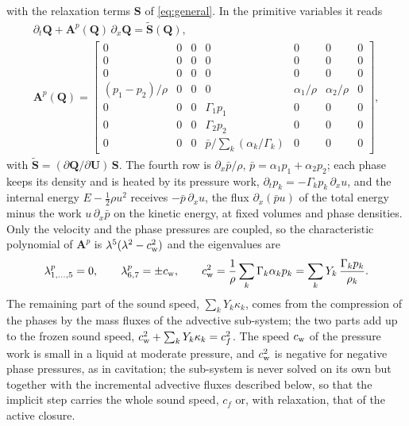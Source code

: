 \begin{enumerate}
\begin{equation}
\label{eq:pressure_sub}
\end{equation}
with the relaxation terms $\mathbf S$ of \eqref{eq:general}. In the primitive variables it reads
\begin{equation}
\begin{gathered}
\partial_t\mathbf Q+\mathbf A^p(\mathbf Q)\,\partial_x\mathbf Q=\tilde{\mathbf S}(\mathbf Q),\\
\mathbf A^p(\mathbf Q)=\begin{bmatrix}
0&0&0&0&0&0&0\\
0&0&0&0&0&0&0\\
0&0&0&0&0&0&0\\
(p_1-p_2)/\rho&0&0&0&\alpha_1/\rho&\alpha_2/\rho&0\\
0&0&0&\Gamma_1p_1&0&0&0\\
0&0&0&\Gamma_2p_2&0&0&0\\
0&0&0&\bar p\big/\sum_k(\alpha_k/\Gamma_k)&0&0&0
\end{bmatrix},
\end{gathered}
\label{eq:Ap}
\end{equation}
with $\tilde{\mathbf S}=(\partial\mathbf Q/\partial\mathbf U)\,\mathbf S$. The fourth row is $\partial_x\bar p/\rho$, $\bar p=\alpha_1p_1+\alpha_2p_2$; each phase keeps its
density and is heated by its pressure work, $\partial_tp_k=-\Gamma_kp_k\,\partial_xu$, and the internal energy $E-\tfrac12\rho u^2$ receives $-\bar p\,\partial_xu$, the flux $\partial_x(\bar pu)$ of the total energy
minus the work $u\,\partial_x\bar p$ on the kinetic energy, at fixed volumes and phase densities. Only the velocity and the phase pressures are
coupled, so the characteristic polynomial of $\mathbf A^p$ is $\lambda^5(\lambda^2-c_{\rm w}^2)$ and the eigenvalues are
\begin{equation}
\lambda^p_{1,\dots,5}=0,\qquad \lambda^p_{6,7}=\pm c_{\rm w},\qquad c_{\rm w}^2=\frac1\rho\sum_k\Gamma_k\alpha_kp_k=\sum_kY_k\,\frac{\Gamma_kp_k}{\rho_k} .
\label{eq:eig_p}
\end{equation}
The remaining part of the sound speed, $\sum_kY_k\kappa_k$, comes from the compression of the phases by the mass fluxes of the
advective sub-system; the two parts add up to the frozen sound speed, $c_{\rm w}^2+\sum_kY_k\kappa_k=c_f^2$. The
speed $c_{\rm w}$ of the pressure work is small in a liquid at moderate pressure, and $c_{\rm w}^2$ is negative for negative phase
pressures, as in cavitation; the sub-system is never solved on its own but together with the incremental advective fluxes
described below, so that the implicit step carries the whole sound speed, $c_f$ or, with relaxation, that of the active closure.
\end{enumerate}
